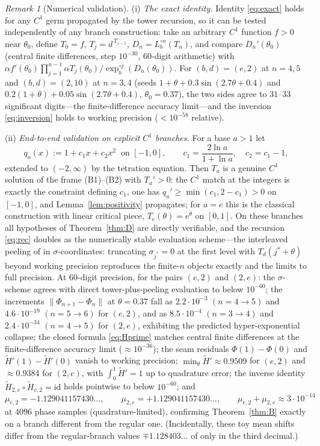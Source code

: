 \documentclass[11pt]{article}
\theoremstyle{definition}
\theoremstyle{remark}
\newtheorem{remark}[theorem]{Remark}
\newcommand{\Lb}{L_{b}}
\newcommand{\Td}{T_{d}}
\newcommand{\expb}{\exp_{b}}
\newcommand{\Ht}{\widetilde H}
\begin{document}
\begin{remark}[Numerical validation]\label{rem:numerics}
\textup{(i)} \emph{The exact identity.} Identity \eqref{eq:exact} holds
for any $C^{1}$ germ propagated by the tower recursion, so it can be
tested independently of any branch construction: take an arbitrary
$C^{1}$ function $f>0$ near $\theta_0$, define $T_0=f$,
$T_j=d^{\,T_{j-1}}$, $D_n=\Lb^{\circ n}(T_n)$, and compare
$D_n'(\theta_0)$ (central finite differences, step $10^{-30}$, $60$-digit
arithmetic) with
$\alpha f'(\theta_0)\prod_{j=1}^{n-1}\alpha T_j(\theta_0)/
\expb^{\circ j}(D_n(\theta_0))$. For $(b,d)=(e,2)$ at $n=4,5$ and
$(b,d)=(2,10)$ at $n=3,4$ (seeds $1+\theta+0.3\sin(2.7\theta+0.4)$ and
$0.2(1+\theta)+0.05\sin(2.7\theta+0.4)$, $\theta_0=0.37$), the two sides
agree to $31$--$33$ significant digits---the finite-difference accuracy
limit---and the inversion \eqref{eq:inversion} holds to working
precision ($<10^{-58}$ relative).

\textup{(ii)} \emph{End-to-end validation on explicit $C^{1}$ branches.}
For a base $a>1$ let
\[
q_a(x):=1+c_1x+c_2x^{2}\ \text{ on }[-1,0],
\qquad
c_1=\frac{2\ln a}{1+\ln a},\quad c_2=c_1-1,
\]
extended to $(-2,\infty)$ by the tetration equation. Then $T_a$ is a
genuine $C^{1}$ solution of the frame (B1)--(B2) with $T_a'>0$: the
$C^{1}$ match at the integers is exactly the constraint defining $c_1$,
one has $q_a'\ge\min(c_1,2-c_1)>0$ on $[-1,0]$, and
Lemma~\ref{lem:positivity} propagates; for $a=e$ this is the classical
construction with linear critical piece, $T_e(\theta)=e^{\theta}$ on
$[0,1]$. On these branches all hypotheses of Theorem~\ref{thm:D} are
directly verifiable, and the recursion \eqref{eq:rec} doubles as the
numerically stable evaluation scheme---the interleaved peeling of
\cite[App.~A]{J} in $\sigma$-coordinates: truncating $\sigma_{j^*}=0$ at
the first level with $\Td(j^*+\theta)$ beyond working precision
reproduces the finite-$n$ objects exactly and the limits to full
precision. At $60$-digit precision, for the pairs $(e,2)$ and $(2,e)$:
the $\sigma$-scheme agrees with direct tower-plus-peeling evaluation to
below $10^{-60}$; the increments $\|\Phi_{n+1}-\Phi_n\|$ at
$\theta=0.37$ fall as $2.2\cdot10^{-3}$ $(n{=}4{\to}5)$ and
$4.6\cdot10^{-19}$ $(n{=}5{\to}6)$ for $(e,2)$, and as $8.5\cdot10^{-4}$
$(n{=}3{\to}4)$ and $2.4\cdot10^{-34}$ $(n{=}4{\to}5)$ for $(2,e)$,
exhibiting the predicted hyper-exponential collapse; the closed formula
\eqref{eq:Hprime} matches central finite differences at the
finite-difference accuracy limit ($\approx10^{-36}$); the seam residuals
$\Phi(1)-\Phi(0)$ and $\Ht'(1)-\Ht'(0)$ vanish to working precision;
$\min_\theta\Ht'\approx0.9509$ for $(e,2)$ and $\approx0.9384$ for
$(2,e)$, with $\int_0^1\Ht'=1$ up to quadrature error; the inverse
identity $\Ht_{2,e}\circ\Ht_{e,2}=\mathrm{id}$ holds pointwise to below
$10^{-60}$; and
\[
\mu_{e,2}=-1.129041157430\ldots,\qquad
\mu_{2,e}=+1.129041157430\ldots,\qquad
\mu_{e,2}+\mu_{2,e}\approx 3\cdot10^{-14}
\]
at $4096$ phase samples (quadrature-limited), confirming
Theorem~\ref{thm:B} exactly on a branch different from the regular one.
(Incidentally, these toy mean shifts differ from the regular-branch
values $\mp1.128403\ldots$ of \cite[Table~1]{J} only in the third
decimal.)
\end{remark}
\end{document}

